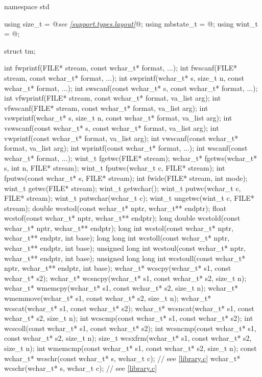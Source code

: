 \begin{codeblock}
namespace std {
  using size_t = @\textit{see \ref{support.types.layout}}@;
  using mbstate_t = @\seebelow@;
  using wint_t = @\seebelow@;

  struct tm;

  int fwprintf(FILE* stream, const wchar_t* format, ...);
  int fwscanf(FILE* stream, const wchar_t* format, ...);
  int swprintf(wchar_t* s, size_t n, const wchar_t* format, ...);
  int swscanf(const wchar_t* s, const wchar_t* format, ...);
  int vfwprintf(FILE* stream, const wchar_t* format, va_list arg);
  int vfwscanf(FILE* stream, const wchar_t* format, va_list arg);
  int vswprintf(wchar_t* s, size_t n, const wchar_t* format, va_list arg);
  int vswscanf(const wchar_t* s, const wchar_t* format, va_list arg);
  int vwprintf(const wchar_t* format, va_list arg);
  int vwscanf(const wchar_t* format, va_list arg);
  int wprintf(const wchar_t* format, ...);
  int wscanf(const wchar_t* format, ...);
  wint_t fgetwc(FILE* stream);
  wchar_t* fgetws(wchar_t* s, int n, FILE* stream);
  wint_t fputwc(wchar_t c, FILE* stream);
  int fputws(const wchar_t* s, FILE* stream);
  int fwide(FILE* stream, int mode);
  wint_t getwc(FILE* stream);
  wint_t getwchar();
  wint_t putwc(wchar_t c, FILE* stream);
  wint_t putwchar(wchar_t c);
  wint_t ungetwc(wint_t c, FILE* stream);
  double wcstod(const wchar_t* nptr, wchar_t** endptr);
  float wcstof(const wchar_t* nptr, wchar_t** endptr);
  long double wcstold(const wchar_t* nptr, wchar_t** endptr);
  long int wcstol(const wchar_t* nptr, wchar_t** endptr, int base);
  long long int wcstoll(const wchar_t* nptr, wchar_t** endptr, int base);
  unsigned long int wcstoul(const wchar_t* nptr, wchar_t** endptr, int base);
  unsigned long long int wcstoull(const wchar_t* nptr, wchar_t** endptr, int base);
  wchar_t* wcscpy(wchar_t* s1, const wchar_t* s2);
  wchar_t* wcsncpy(wchar_t* s1, const wchar_t* s2, size_t n);
  wchar_t* wmemcpy(wchar_t* s1, const wchar_t* s2, size_t n);
  wchar_t* wmemmove(wchar_t* s1, const wchar_t* s2, size_t n);
  wchar_t* wcscat(wchar_t* s1, const wchar_t* s2);
  wchar_t* wcsncat(wchar_t* s1, const wchar_t* s2, size_t n);
  int wcscmp(const wchar_t* s1, const wchar_t* s2);
  int wcscoll(const wchar_t* s1, const wchar_t* s2);
  int wcsncmp(const wchar_t* s1, const wchar_t* s2, size_t n);
  size_t wcsxfrm(wchar_t* s1, const wchar_t* s2, size_t n);
  int wmemcmp(const wchar_t* s1, const wchar_t* s2, size_t n);
  const wchar_t* wcschr(const wchar_t* s, wchar_t c);  // see \ref{library.c}
  wchar_t* wcschr(wchar_t* s, wchar_t c);  // see \ref{library.c}
}
\end{codeblock}
